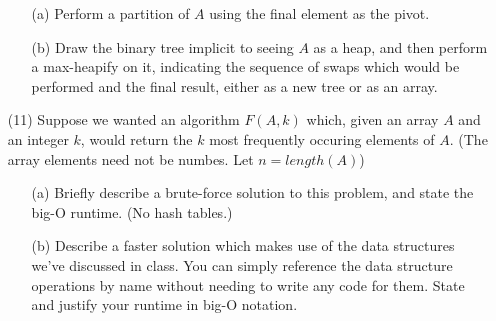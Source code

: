 \documentclass[12pt]{article}
\begin{document}
\begin{enumerate}
\begin{center}
        \end{center}
    \begin{itemize}
        \item[(a)] Perform a partition of $A$ using the final element as the pivot. \vspace{10cm}
        \item[(b)] Draw the binary tree implicit to seeing $A$ as a heap, and then perform a max-heapify on it, indicating the sequence of swaps which would be performed and the final result, either as a new tree or as an array. \vspace{5cm}
    \end{itemize}
    \newpage
    \item[(11)] Suppose we wanted an algorithm $F(A,k)$ which, given an array $A$ and an integer $k$, would return the $k$ most frequently occuring elements of $A$. (The array elements need not be numbes. Let $n = length(A)$)
    \begin{itemize}
        \item[(a)] Briefly describe a brute-force solution to this problem, and state the big-O runtime. (No hash tables.) \vspace{7cm}
        \item[(b)] Describe a faster solution which makes use of the data structures we've discussed in class. You can simply reference the data structure operations by name without needing to write any code for them. State and justify your runtime in big-O notation. \vspace{7cm}
    \end{itemize}


\end{enumerate}
\end{document}

